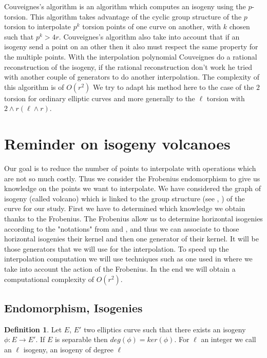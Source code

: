 \documentclass{article}
\theoremstyle{plain}
\theoremstyle{definition}
\newtheorem{defi}[thm]{Definition}
\theoremstyle{remark}
\begin{document}
Couveignes's algorithm \cite{couveignes96} is an algorithm which computes an isogeny using the $p$-torsion. This algorithm takes advantage of the cyclic group structure of the $p$ torsion to interpolate $p^k$ torsion points of one curve on another, with $k$ chosen such that $p^k>4r$. Couveignes's algorithm also take into account that if an isogeny send a point on an other then it also must respect the same property for the multiple points. With the interpolation polynomial Couveignes do a rational reconstruction of the isogeny, if the rational reconstruction don't work he tried with another couple of generators to do another interpolation. The complexity of this algorithm is of $O(r^2)$
\newline
We try to adapt his method here to the case of the $2$ torsion for ordinary elliptic curves and more generally to the $\ell$ torsion with $2 \wedge r ( \ell \wedge r)$.


\section{Reminder on isogeny volcanoes}
Our goal is to reduce the number of points to interpolate with operations which are not so much costly. Thus we consider the Frobenius endomorphism to give us knowledge on the points we want to interpolate. We have considered the graph of isogeny (called volcano) which is linked to the group structure (see \cite{MiretMRV05}, \cite{IonicaJ10} ) of the curve for our study. First we have to determined which knowledge we obtain thanks to the Frobenius. The Frobenius allow us to determine horizontal isogenies according to the "notations" from \cite{Kohel} and \cite{volcano}, and thus we can associate to those horizontal isogenies their kernel and then one generator of their kernel. It will be those generators that we will use for the interpolation. To speed up the interpolation computation we will use techniques such as one used in \cite{enge+morain03} where we take into account the action of the Frobenius. In the end we will obtain a computational complexity of $O(r^2)$.
\subsection{Endomorphism, Isogenies}
\begin{defi}
Let $E$, $E'$ two elliptics curve such that there exists an isogeny $\phi: E \rightarrow E'$. If $E$ is separable then $deg(\phi)=ker(\phi)$. For $\ell$ an integer we call an $\ell$ isogeny, an isogeny of degree $\ell$
\end{defi}
\end{document}
